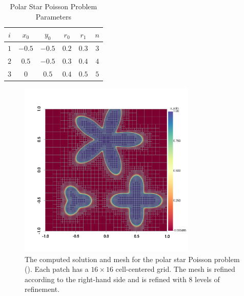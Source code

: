 \begin{table}[ht]
    \begin{center}
        \caption{Polar Star Poisson Problem Parameters}
        \begin{tabular}{|c|c|c|c|c|c|}
            \hline
            $i$ & $x_0$ & $y_0$ & $r_0$ & $r_1$ & $n$ \\
            \hline
            $1$ & $-0.5$ & $-0.5$ & $0.2$ & $0.3$ & $3$ \\
            $2$ & $0.5$ & $-0.5$ & $0.3$ & $0.4$ & $4$ \\
            $3$ & $0$ & $0.5$ & $0.4$ & $0.5$ & $5$ \\
            \hline
        \end{tabular}
        \label{table:polar_star_parameters}
    \end{center}
\end{table}

\begin{figure}
    \centering
    \includegraphics[width=0.75\textwidth, trim={0 100 0 0}]{figures/plot_polar_star.png}
    \caption{The computed solution and mesh for the polar star Poisson problem (). Each patch has a $16 \times 16$ cell-centered grid. The mesh is refined according to the right-hand side and is refined with 8 levels of refinement.}
    \label{fig:polar_star_plot}
\end{figure}

